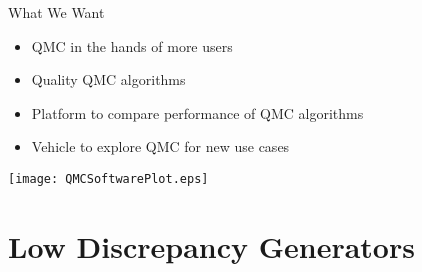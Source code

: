 \documentclass[11pt,compress,xcolor={usenames,dvipsnames},aspectratio=169]{beamer}
\begin{document}
\begin{frame}{What We Want}
\begin{multicols}{2}
	\begin{itemize}
		\item QMC in the hands of more users
		
		\item Quality QMC algorithms
		
		\item Platform to compare performance of QMC algorithms
		
		\item Vehicle to explore QMC for new use cases
		
	\end{itemize}
	
	\columnbreak
\texttt{[image: QMCSoftwarePlot.eps]}	
\end{multicols}

\end{frame}


\section{Low Discrepancy Generators}
\end{document}
